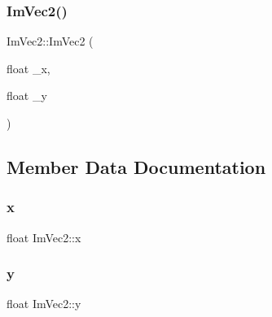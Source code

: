 \subsubsection{\texorpdfstring{Im\+Vec2()}{ImVec2()}\hspace{0.1cm}{\footnotesize\ttfamily [2/2]}}
{\footnotesize\ttfamily Im\+Vec2\+::\+Im\+Vec2 (\begin{DoxyParamCaption}\item[{float}]{\+\_\+x,  }\item[{float}]{\+\_\+y }\end{DoxyParamCaption})}



\subsection{Member Data Documentation}
\hypertarget{struct_im_vec2_a5802a68560961ed8cb8cc5fb2a244c2d}{}\label{struct_im_vec2_a5802a68560961ed8cb8cc5fb2a244c2d} 
\subsubsection{\texorpdfstring{x}{x}}
{\footnotesize\ttfamily float Im\+Vec2\+::x}

\hypertarget{struct_im_vec2_a1f9d136ca837e147b793b19d25a3a618}{}\label{struct_im_vec2_a1f9d136ca837e147b793b19d25a3a618} 
\subsubsection{\texorpdfstring{y}{y}}
{\footnotesize\ttfamily float Im\+Vec2\+::y}

